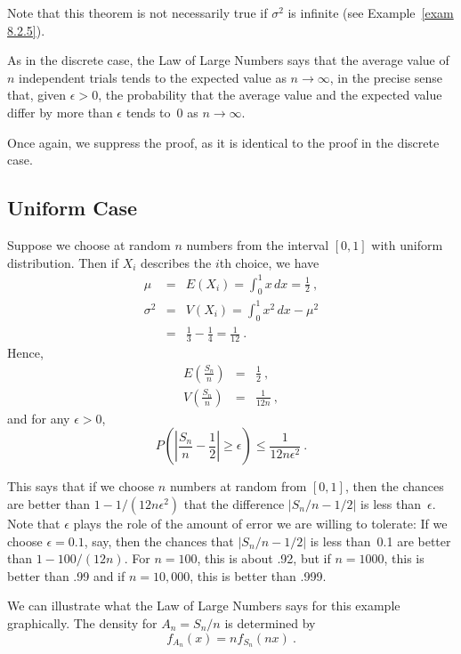 {Note that this theorem is not necessarily true if $\sigma^2$ is infinite
(see Example~\ref{exam 8.2.5}).

As in the discrete case, the Law of Large Numbers says that the average value
of $n$ independent trials tends to the expected value as $n \to \infty$, in the
precise sense that, given $\epsilon > 0$, the probability that the average
value and the expected value differ by more than $\epsilon$ tends to~0 as $n
\to \infty$.

Once again, we suppress the proof, as it is identical to the proof in the discrete case.
\subsection*{Uniform Case}
\begin{example}
Suppose we choose at random $n$ numbers from the interval $[0,1]$ with
uniform distribution.  Then if $X_i$ describes the $i$th choice, we have
\begin{eqnarray*}
          \mu & = & E(X_i) = \int_0^1 x\, dx = \frac 12\ , \\
     \sigma^2 & = & V(X_i) = \int_0^1 x^2\, dx - \mu^2 \\
              & = & \frac 13 - \frac 14 = \frac 1{12}\ .
\end{eqnarray*}
Hence,
\begin{eqnarray*}
E \left( \frac {S_n}n \right)  & = & \frac 12\ , \\
V \left( \frac {S_n}n \right)  & = & \frac 1{12n}\ ,
\end{eqnarray*}
and for any $\epsilon > 0$,
$$
P \left( \left| \frac {S_n}n - \frac 12 \right| \geq \epsilon \right) \leq \frac
1{12n \epsilon^2}\ .
$$

This says that if we choose $n$ numbers at random from $[0,1]$, then the
chances are better than $1 - 1/(12n\epsilon^2)$ that the difference $|S_n/n -
1/2|$ is less than~$\epsilon$.  Note that $\epsilon$ plays the role of the
amount of error we are willing to tolerate: If we choose $\epsilon = 0.1$, say,
then the chances that $|S_n/n - 1/2|$ is less than~0.1 are better than $1 -
100/(12n)$.  For $n = 100$, this is about .92, but if $n = 1000$, this is better
than .99 and if $n = 10{,}000$, this is better than .999.

We can illustrate what the Law of Large Numbers says for this example
graphically.  The density for $A_n = S_n/n$ is determined by
$$
f_{A_n}(x) = nf_{S_n}(nx)\ .
$$


\end{example}}
